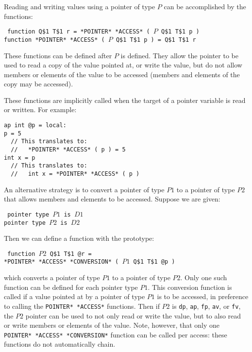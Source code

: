 \documentclass[12pt]{article}
\newenvironment{indpar}[1][0.3in]%
	{\begin{list}{}%
		     {\setlength{\itemsep}{0in}%
		      \setlength{\topsep}{0in}%
		      \setlength{\parsep}{1ex}%
		      \setlength{\labelwidth}{#1}%
		      \setlength{\leftmargin}{#1}%
		      \addtolength{\leftmargin}{\labelsep}}%
	 \item}%
	{\end{list}}
\begin{document}
Reading and writing values using a pointer of type $P$
can be accomplished by the functions:

\begin{indpar} \tt
function Q\$1 T\$1 r = *POINTER* *ACCESS* ( $P$ Q\$1 T\$1 p ) \\
function *POINTER* *ACCESS* ( $P$ Q\$1 T\$1 p ) = Q\$1 T\$1 r
\end{indpar}

These functions can be defined after $P$ is defined.
They allow the pointer to be used to read a copy of the
value pointed at, or write the value, but do not allow
members or elements of the value to be accessed
(members and elements of the copy may be accessed).

These functions are implicitly called when the target
of a pointer variable is read or written.  For example:
\begin{indpar}\begin{verbatim}
ap int @p = local:
p = 5
  // This translates to:
  //   *POINTER* *ACCESS* ( p ) = 5
int x = p
  // This translates to:
  //   int x = *POINTER* *ACCESS* ( p )
\end{verbatim}\end{indpar}

An alternative strategy is to convert a pointer of type $P1$
to a pointer of type $P2$ that allows members and elements
to be accessed.  Suppose we are given:
\begin{indpar} \tt
pointer type $P1$ is $D1$ \\
pointer type $P2$ is $D2$
\end{indpar}

Then we can define a function with the prototype:
\begin{indpar} \tt
function $P2$ Q\$1 T\$1 @r = \\
\hspace*{1in}*POINTER* *ACCESS* *CONVERSION* ( $P1$ Q\$1 T\$1 @p )
\end{indpar}
which converts a pointer of type $P1$ to a pointer of type $P2$.
Only one such function can be defined for each pointer type $P1$.
This conversion function
is called if a value pointed at by a pointer of type $P1$ is to
be accessed, in preference to calling the {\tt *POINTER* *ACCESS*}
functions.  Then if $P2$ is {\tt dp}, {\tt ap}, {\tt fp}, {\tt av},
or {\tt fv}, the $P2$ pointer can be used to not only read or write
the value, but to also read or write members or elements of the
value.  Note, however, that only one {\tt *POINTER* *ACCESS* *CONVERSION*}
function can be called per access: these functions do not
automatically chain.
\end{document}
